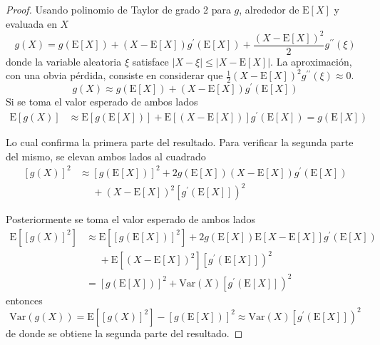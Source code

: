 \documentclass[12pt,letterpaper]{book}
\newcommand{\prima}{^{\prime}}
\newcommand{\E}[1]{\mathrm{E}\left[ #1 \right]}
\newcommand{\Var}[1]{\mathrm{Var}\left( #1 \right)}
\newcommand{\abso}[1]{\left| #1 \right|}
\newcommand{\pheq}{\phantom{=}}
\begin{document}
\begin{proof}
Usando polinomio de Taylor de grado 2 para $g$, alrededor de $\E{X}$ y evaluada en $X$
\begin{equation}
g(X) = g\left( \E{X} \right) + \left(X - \E{X} \right) g\prima \left( \E{X} \right) + \frac{\left( X - \E{X} \right)^{2}}{2} g^{\prime \prime}(\xi)
\label{detalle:aprox}
\end{equation}
donde la variable aleatoria $\xi$ satisface $\abso{X-\xi} \leq \abso{X - \E{X}}$.
%
La aproximación, con una obvia pérdida, consiste en considerar que $\frac{1}{2}\left( X - \E{X} \right)^{2} g^{\prime \prime}(\xi) \approx 0$.
\begin{equation}
g(X) \approx g\left( \E{X} \right) + \left(X - \E{X} \right) g\prima \left( \E{X} \right)
\end{equation}
Si se toma el valor esperado de ambos lados
\begin{align}
\E{g(X)} &\approx \E{g\left( \E{X} \right)} + \E{\left(X - \E{X} \right)} g\prima \left( \E{X} \right) = g\left( \E{X} \right)
\end{align}

Lo cual confirma la primera parte del resultado. Para verificar la segunda parte del mismo, se elevan ambos lados al cuadrado
\begin{align}
\left[g(X)\right]^{2} &\approx \left[g\left( \E{X} \right)\right]^{2} + 2 g\left( \E{X} \right) \left(X - \E{X} \right) g\prima \left( \E{X} \right) \nonumber \\
&\pheq + \left(X - \E{X} \right)^{2} \left[ g\prima \left( \E{X} \right] \right)^{2}
\end{align}

Posteriormente se toma el valor esperado de ambos lados
\begin{align*}
\E{\left[g(X)\right]^{2}} &\approx \E{\left[g\left( \E{X} \right)\right]^{2}} + 2 g\left( \E{X} \right) \E{X - \E{X} } g\prima \left( \E{X} \right) \nonumber \\
&\pheq + \E{\left(X - \E{X} \right)^{2}} \left[ g\prima \left( \E{X} \right] \right)^{2} \\
&= \left[g\left( \E{X} \right)\right]^{2} + \Var{X} \left[ g\prima \left( \E{X} \right] \right)^{2}
\end{align*}
entonces
\begin{equation}
\Var{g(X)} = \E{\left[g(X)\right]^{2}} - \left[g\left( \E{X} \right)\right]^{2} \approx \Var{X} \left[ g\prima \left( \E{X} \right] \right)^{2}
\end{equation}
de donde se obtiene la segunda parte del resultado. 

\end{proof}
\end{document}
